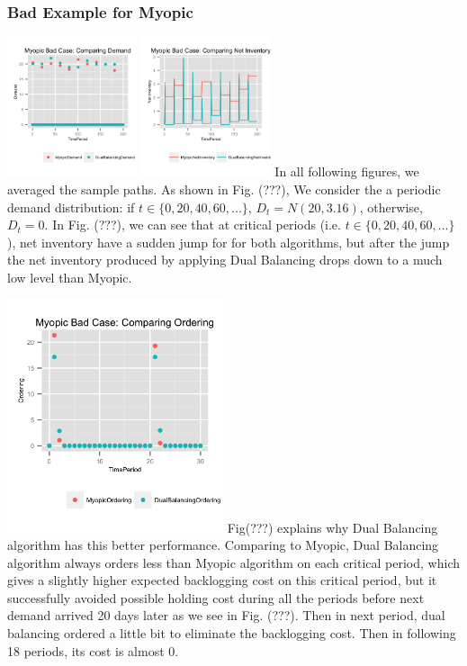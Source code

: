 \documentclass[twoside]{article}
\begin{document}
\begin{multicols}{2}
 \subsubsection{Bad Example for Myopic} 
  \includegraphics[width=1.5in]{figures/MyopicBadDemand.png}
  \includegraphics[width=1.5in]{figures/MyopicBadNetInventory.png}
  In all following figures, we averaged the sample paths. As shown in Fig. (???), We consider the a periodic demand distribution: if $t\in \{0,20,40,60,...\}$, $D_t=N(20,3.16)$, otherwise, $D_t=0$.  In Fig. (???), we can see that at critical periods (i.e. $t\in \{0,20,40,60,...\}$), net inventory have a sudden jump for for both algorithms, but after the jump the net inventory produced by applying Dual Balancing drops down to a much low level than Myopic.
  
  \includegraphics[width=2.5in]{figures/MyopicBadOrdering.png}
  Fig(???) explains why Dual Balancing algorithm has this better performance. Comparing to Myopic, Dual Balancing algorithm always orders less than Myopic algorithm on each critical period, which gives a slightly higher expected backlogging cost on this critical period, but it successfully avoided possible holding cost during all the periods before next demand arrived 20 days later as we see in Fig. (???). Then in next period, dual balancing ordered a little bit to eliminate the backlogging cost. Then in following 18 periods, its cost is almost 0. 


\end{multicols}
\end{document}
